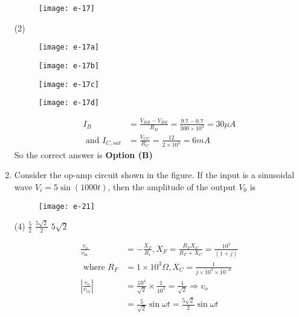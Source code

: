 \begin{enumerate}
\begin{figure}[H]
\centering
\texttt{[image: e-17]}
\end{figure}
\begin{tasks}(2)
\task[\textbf{A.}] \begin{figure}[H]
	\centering
	\texttt{[image: e-17a]}
\end{figure}
\task[\textbf{B.}] \begin{figure}[H]
	\centering
	\texttt{[image: e-17b]}
\end{figure}
\task[\textbf{C.}] \begin{figure}[H]
	\centering
	\texttt{[image: e-17c]}
\end{figure}
\task[\textbf{D.}] \begin{figure}[H]
	\centering
	\texttt{[image: e-17d]}
\end{figure}
\end{tasks}
\begin{answer}
\begin{align*}
I_{B}&=\frac{V_{B B}-V_{B E}}{R_{B}}=\frac{9.7-0.7}{300 \times 10^{3}}=30 \mu A\\\text{ and } I_{C, s a t}&=\frac{V_{C C}}{R_{C}}=\frac{12}{2 \times 10^{3}}=6 m A
\end{align*}
So the correct answer is \textbf{Option (B)}
\end{answer}
	\item Consider the op-amp circuit shown in the figure.
	If the input is a sinusoidal wave $V_{i}=5 \sin (1000 t)$, then the amplitude of the output $V_{0}$ is
\begin{figure}[H]
\centering
\texttt{[image: e-21]}
\end{figure}
\begin{tasks}(4)
\task[\textbf{A.}] $\frac{5}{2}$
\task[\textbf{C.}] $\frac{5 \sqrt{2}}{2}$
\task[\textbf{D.}] $5 \sqrt{2}$
\end{tasks}
\begin{answer}
\begin{align*}
\frac{v_{o}}{v_{\text {in }}}&=-\frac{X_{F}}{R_{1}}, X_{F}=\frac{R_{F} X_{C}}{R_{F}+X_{C}}=\frac{10^{3}}{(1+j)}\\\text{ where }R_{F}&=1 \times 10^{3} \Omega, X_{C}=\frac{1}{j \times 10^{3} \times 10^{-6}}\\
\left|\frac{v_{o}}{v_{i n}}\right|&=\frac{10^{3}}{\sqrt{2}} \times \frac{1}{10^{3}}=\frac{1}{\sqrt{2}} \Rightarrow v_{o}\\&=\frac{5}{\sqrt{2}} \sin \omega t=\frac{5 \sqrt{2}}{2} \sin \omega t

\end{align*}
\end{answer}
\end{enumerate}
